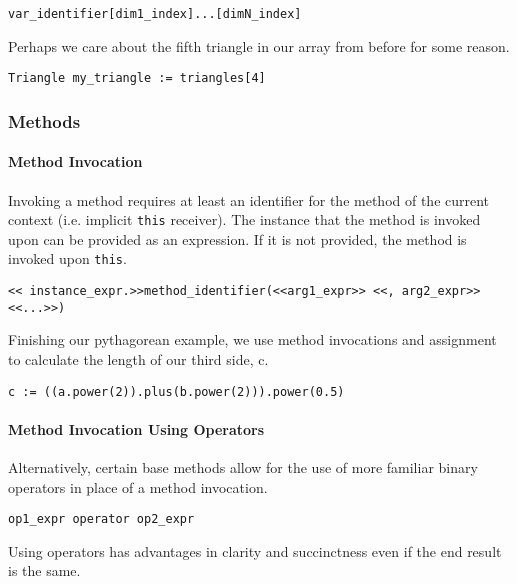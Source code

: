 \begin{lstlisting}
var_identifier[dim1_index]...[dimN_index]
\end{lstlisting}

Perhaps we care about the fifth triangle in our array from before for some reason.

\begin{lstlisting}[caption=Array Dereferencing a Triangle, backgroundcolor=\color{tintedorange}]
Triangle my_triangle := triangles[4]
\end{lstlisting}


\subsubsection{Methods}
\paragraph{Method Invocation}
Invoking a method requires at least an identifier for the method of the current context (i.e. implicit \verb!this! receiver). The instance that the method is invoked upon can be provided as an expression. If it is not provided, the method is invoked upon \verb!this!.

\begin{lstlisting}
<< instance_expr.>>method_identifier(<<arg1_expr>> <<, arg2_expr>> <<...>>)
\end{lstlisting}

Finishing our pythagorean example, we use method invocations and assignment to calculate the length of our third side, c.

\begin{lstlisting}[backgroundcolor=\color{tintedorange},caption=Method Invocation for the Pythagorean Theorem Using Methods]
c := ((a.power(2)).plus(b.power(2))).power(0.5)
\end{lstlisting}

\paragraph{Method Invocation Using Operators}
Alternatively, certain base methods allow for the use of more familiar binary operators in place of a method invocation.

\begin{lstlisting}
op1_expr operator op2_expr
\end{lstlisting}

Using operators has advantages in clarity and succinctness even if the end result is the same.

